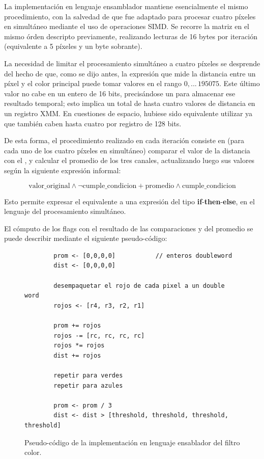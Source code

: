 La implementación en lenguaje ensamblador mantiene esencialmente el mismo procedimiento, con la salvedad de que fue adaptado para procesar cuatro píxeles en simultáneo mediante el uso de operaciones SIMD. Se recorre la matriz en el mismo órden descripto previamente, realizando lecturas de 16 bytes por iteración (equivalente a 5 píxeles y un byte sobrante).

La necesidad de limitar el procesamiento simultáneo a cuatro píxeles se desprende del hecho de que, como se dijo antes, la expresión que mide la distancia entre un píxel y el color principal puede tomar valores en el rango $0, ... \,195075$. Este último valor no cabe en un entero de 16 bits, precisándose un  para almacenar ese resultado temporal; esto implica un total de hasta cuatro valores de distancia en un registro XMM. En cuestiones de espacio, hubiese sido equivalente utilizar  ya que también caben hasta cuatro por registro de 128 bits.

De esta forma, el procedimiento realizado en cada iteración consiste en (para cada uno de los cuatro píxeles en simultáneo) comparar el valor de la distancia con el , y calcular el promedio de los tres canales, actualizando luego sus valores según la siguiente expresión informal:

$$\text{valor\_original} \land \lnot \text{cumple\_condicion} + \text{promedio} \land \text{cumple\_condicion}$$

Esto permite expresar el equivalente a una expresión del tipo \textbf{if}-\textbf{then}-\textbf{else}, en el lenguaje del procesamiento simultáneo.

El cómputo de los flags con el resultado de las comparaciones y del promedio se puede describir mediante el siguiente pseudo-código:

\begin{figure}
	\begin{mdframed}
	\begin{center}
		\begin{lstlisting}
		prom <- [0,0,0,0] 			// enteros doubleword
		dist <- [0,0,0,0]
	
		desempaquetar el rojo de cada pixel a un double word
		rojos <- [r4, r3, r2, r1]
	
		prom += rojos
		rojos -= [rc, rc, rc, rc]
		rojos *= rojos
		dist += rojos
	
		repetir para verdes
		repetir para azules
	
		prom <- prom / 3
		dist <- dist > [threshold, threshold, threshold, threshold]	
		\end{lstlisting}
	\end{center}
	\end{mdframed}
	\caption{Pseudo-código de la implementación en lenguaje ensablador del filtro color.}
\end{figure}


